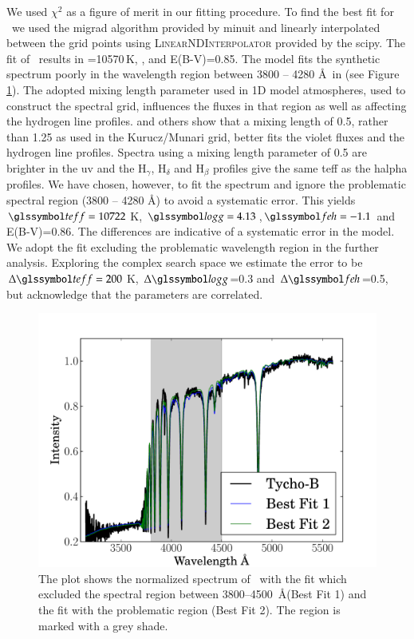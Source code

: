 We used $\chi^2$ as a figure of merit in our fitting procedure. To find the best fit for \starb\ we used the \gls{migrad} algorithm provided by \gls{minuit} and linearly interpolated between the grid points using \textsc{LinearNDInterpolator} provided by the \gls{scipy}. The fit of \starb\ results in =10570\,\textrm{K}, ,  and E(B-V)=0.85. The model fits the synthetic spectrum poorly  in the wavelength region between 3800 -- 4280 \AA\ in (see Figure \ref{fig:starb_spec_comp}). The adopted mixing length parameter used in 1D model atmospheres, used to construct the spectral grid, influences the fluxes in that region as well as affecting the hydrogen line profiles. \citet{2002A&A...392..619H} and others show that a mixing length of 0.5, rather than 1.25 as used in the Kurucz/Munari grid, better fits the violet fluxes and the hydrogen line profiles. Spectra using a mixing length parameter of 0.5 are brighter in the \gls{uv} and the $\textrm{H}_\gamma$, $\textrm{H}_\delta$ and $\textrm{H}_\beta$ profiles give the same \gls{teff} as the \gls{halpha} profiles. We have chosen, however, to fit the spectrum and ignore the problematic spectral region (3800 -- 4280 \AA) to avoid a systematic error. This yields $\teff=10722$\,K, $\logg=4.13$,$ \feh=-1.1$ and E(B-V)=0.86. The differences are indicative of a systematic error in the model. We adopt the fit excluding the problematic wavelength region in the further analysis. Exploring the complex search space we estimate the error to be $\Delta\teff=200$\,K, $\Delta\logg$=0.3 and $\Delta\feh$=0.5, but acknowledge that the parameters are correlated.  



\begin{figure}[h!]

\includegraphics[width=1.\textwidth]{chapter_sn1572_hires/plots/starb_spec_comp.pdf} 

\caption[Fit of low resolution spectrum of Tycho-B]{The plot shows the normalized spectrum of \starb\ with the fit which excluded the spectral region between 3800--4500~\AA (Best Fit 1) and the fit with the problematic region (Best Fit 2). The region is marked with a grey shade.  }
\label{fig:starb_spec_comp}
\end{figure}

